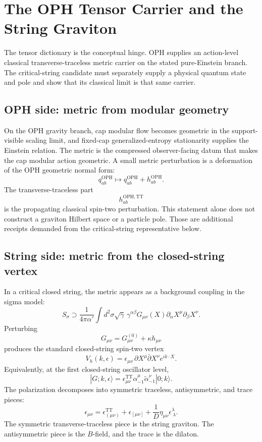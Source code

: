 \documentclass[11pt]{article}
\theoremstyle{remark}
\theoremstyle{plain}
\newcommand{\OPH}{\mathrm{OPH}}
\newcommand{\TT}{\mathrm{TT}}
\begin{document}
\section{The OPH Tensor Carrier and the String Graviton}

The tensor dictionary is the conceptual hinge. OPH supplies an action-level classical
transverse-traceless metric carrier on the stated pure-Einstein branch. The critical-string
candidate must separately supply a physical quantum state and pole and show that its classical
limit is that same carrier.

\subsection{OPH side: metric from modular geometry}

On the OPH gravity branch, cap modular flow becomes geometric in the support-visible scaling
limit, and fixed-cap generalized-entropy stationarity supplies the Einstein relation. The metric is
the compressed observer-facing datum that makes the cap modular action geometric. A small metric
perturbation is a deformation of the OPH geometric normal form:
\[
q_{ab}^{\OPH}\longmapsto q_{ab}^{\OPH}+h_{ab}^{\OPH}.
\]
The transverse-traceless part
\[
h_{ab}^{\OPH,\TT}
\]
is the propagating classical spin-two perturbation. This statement alone does not construct a
graviton Hilbert space or a particle pole. Those are additional receipts demanded from the
critical-string representative below.

\subsection{String side: metric from the closed-string vertex}

In a critical closed string, the metric appears as a background coupling in the sigma model:
\[
S_\sigma\supset
\frac{1}{4\pi\alpha'}
\int d^2\sigma\sqrt\gamma\,\gamma^{\alpha\beta}
G_{\mu\nu}(X)\partial_\alpha X^\mu\partial_\beta X^\nu.
\]
Perturbing
\[
G_{\mu\nu}=G^{(0)}_{\mu\nu}+\kappa h_{\mu\nu}
\]
produces the standard closed-string spin-two vertex
\[
V_h(k,\epsilon)=
\epsilon_{\mu\nu}\,
\partial X^\mu\bar\partial X^\nu e^{ik\cdot X}.
\]
Equivalently, at the first closed-string oscillator level,
\[
|G;k,\epsilon\rangle
=
\epsilon_{\mu\nu}^{\TT}
\alpha_{-1}^{\mu}\tilde\alpha_{-1}^{\nu}|0;k\rangle .
\]
The polarization decomposes into symmetric traceless, antisymmetric, and trace pieces:
\[
\epsilon_{\mu\nu}
=\epsilon^{\TT}_{(\mu\nu)}
+\epsilon_{[\mu\nu]}
+\frac1D\eta_{\mu\nu}\epsilon^\lambda_{\ \lambda}.
\]
The symmetric transverse-traceless piece is the string graviton. The antisymmetric piece is the
\(B\)-field, and the trace is the dilaton.
\end{document}
